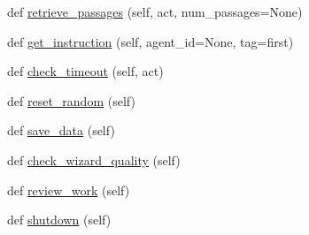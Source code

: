 \begin{DoxyCompactItemize}
\item 
def \hyperlink{classparlai_1_1mturk_1_1tasks_1_1wizard__of__wikipedia_1_1worlds_1_1MTurkWizardOfWikipediaWorld_ac615c171965876c3e092b02c94f1fe3e}{retrieve\+\_\+passages} (self, act, num\+\_\+passages=None)
\item 
def \hyperlink{classparlai_1_1mturk_1_1tasks_1_1wizard__of__wikipedia_1_1worlds_1_1MTurkWizardOfWikipediaWorld_a81fac69dc89399e21b1ad9847b62adea}{get\+\_\+instruction} (self, agent\+\_\+id=None, tag=\textquotesingle{}first\textquotesingle{})
\item 
def \hyperlink{classparlai_1_1mturk_1_1tasks_1_1wizard__of__wikipedia_1_1worlds_1_1MTurkWizardOfWikipediaWorld_a47d3573c428796c437dd7c7d04cdede6}{check\+\_\+timeout} (self, act)
\item 
def \hyperlink{classparlai_1_1mturk_1_1tasks_1_1wizard__of__wikipedia_1_1worlds_1_1MTurkWizardOfWikipediaWorld_a37a32397375c7ac7dfae52bca1ba2f6e}{reset\+\_\+random} (self)
\item 
def \hyperlink{classparlai_1_1mturk_1_1tasks_1_1wizard__of__wikipedia_1_1worlds_1_1MTurkWizardOfWikipediaWorld_a2cc512e7aab47494715260bebda33ca8}{save\+\_\+data} (self)
\item 
def \hyperlink{classparlai_1_1mturk_1_1tasks_1_1wizard__of__wikipedia_1_1worlds_1_1MTurkWizardOfWikipediaWorld_a7667ae6daa0c1befc1c4f815f0daccfd}{check\+\_\+wizard\+\_\+quality} (self)
\item 
def \hyperlink{classparlai_1_1mturk_1_1tasks_1_1wizard__of__wikipedia_1_1worlds_1_1MTurkWizardOfWikipediaWorld_adf9ddc1cbe8f2abc7f42995d621904bf}{review\+\_\+work} (self)
\item 
def \hyperlink{classparlai_1_1mturk_1_1tasks_1_1wizard__of__wikipedia_1_1worlds_1_1MTurkWizardOfWikipediaWorld_ae83f8e16372c0d18ceda5a2de734d146}{shutdown} (self)
\end{DoxyCompactItemize}

